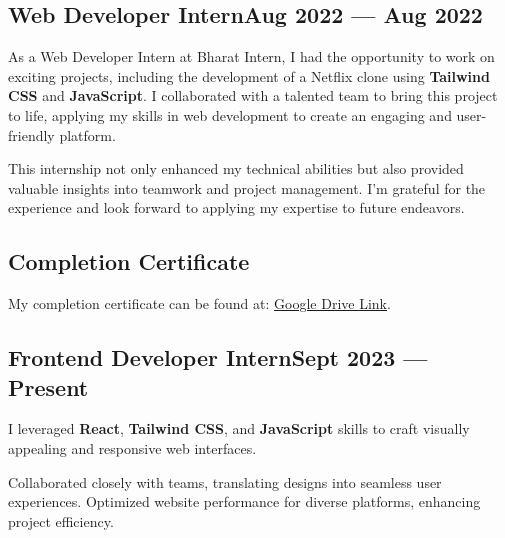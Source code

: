 \subsection{{Web Developer Intern\hfill Aug 2022 --- Aug 2022 }}
\begin{zitemize}
    \item As a Web Developer Intern at Bharat Intern, I had the opportunity to work on exciting projects, including the development of a Netflix clone using \textbf{Tailwind CSS} and \textbf{JavaScript}. I collaborated with a talented team to bring this project to life, applying my skills in web development to create an engaging and user-friendly platform. 
    \item This internship not only enhanced my technical abilities but also provided valuable insights into teamwork and project management. I'm grateful for the experience and look forward to applying my expertise to future endeavors.
\end{zitemize}
\begin{zitemize}
\subsection{{Completion Certificate}}
\item My completion certificate can be found at: \href{https://drive.google.com/file/d/1kW9k5gszJlIEXFur_P-q36PIus9H_Qyk/view?usp=drivesdk}{Google Drive Link}.
\end{zitemize}

\subsection{{Frontend Developer Intern\hfill Sept 2023 --- Present }}
\begin{zitemize}
    \item I leveraged \textbf{React}, \textbf{Tailwind CSS}, and \textbf{JavaScript} skills to craft visually appealing and responsive web interfaces. 
    \item Collaborated closely with teams, translating designs into seamless user experiences. Optimized website performance for diverse platforms, enhancing project efficiency.
\end{zitemize}

